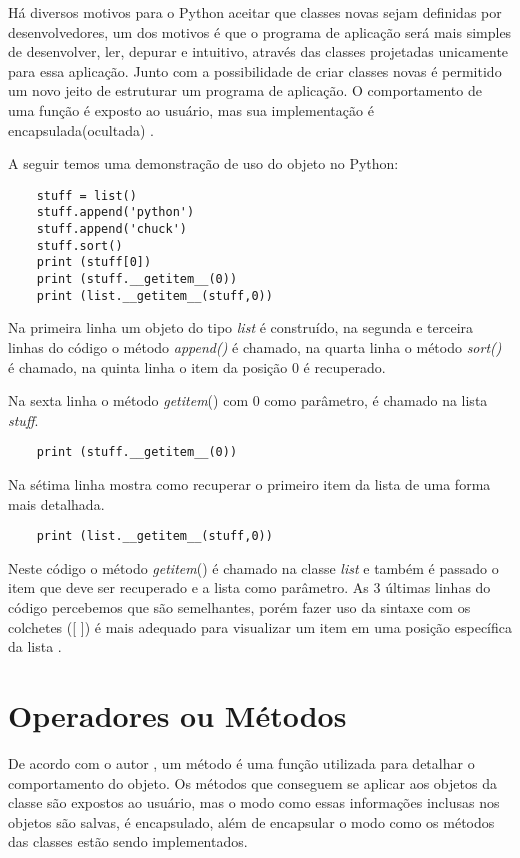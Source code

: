 	Há diversos motivos para o Python aceitar que classes novas sejam definidas por desenvolvedores, um dos motivos é que o programa de aplicação será mais simples de desenvolver, ler, depurar e intuitivo, através das classes projetadas unicamente para essa aplicação. Junto com a possibilidade de criar classes novas é permitido um novo jeito de estruturar um programa de aplicação. O comportamento de uma função é exposto ao usuário, mas sua implementação é encapsulada(ocultada) \cite{Borges2014}. 
	
	A seguir temos uma demonstração de uso do objeto no Python:
	
   \begin{lstlisting}
    stuff = list()
    stuff.append('python')
    stuff.append('chuck')
    stuff.sort()
    print (stuff[0])
    print (stuff.__getitem__(0))
    print (list.__getitem__(stuff,0))
    \end{lstlisting}
	
	Na primeira linha um objeto do tipo \textit{list} é construído, na segunda e terceira linhas do código o método \textit{append()} é chamado, na quarta linha o método \textit{sort()} é chamado, na quinta linha o item da posição 0 é recuperado. 
	
	Na sexta linha o método \textunderscore\textunderscore \textit{getitem}\textunderscore\textunderscore()  com 0 como parâmetro, é chamado na lista \textit{stuff}.
	\begin{lstlisting}
    print (stuff.__getitem__(0))
	\end{lstlisting}

	Na sétima linha mostra como recuperar o primeiro item da lista de uma forma mais detalhada.
	\begin{lstlisting}
    print (list.__getitem__(stuff,0))
	\end{lstlisting}
	
	Neste código o método \textunderscore\textunderscore \textit{getitem}\textunderscore\textunderscore () é chamado na classe \textit{list} e também é passado o item que deve ser recuperado e a lista como parâmetro. As 3 últimas linhas do código percebemos que são semelhantes, porém fazer uso da sintaxe com os colchetes ([ ]) é mais adequado para visualizar um item em uma posição específica da lista \cite{Severance2016}.
	
    \section{Operadores ou Métodos}
	De acordo com o autor \cite{Borges2014}, um método é uma função utilizada para detalhar o comportamento do objeto. Os métodos que conseguem se aplicar aos objetos da classe são expostos ao usuário, mas o modo como essas informações inclusas nos objetos são salvas, é encapsulado, além de encapsular o modo como os métodos das classes estão sendo implementados.
	 
